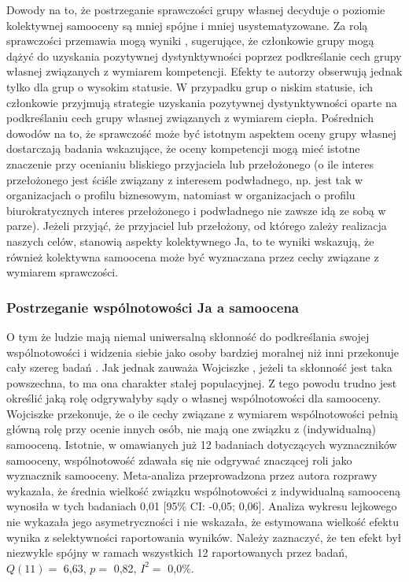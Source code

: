 \documentclass[man]{apa6}
\begin{document}
Dowody na to, że postrzeganie sprawczości grupy własnej decyduje o poziomie kolektywnej samooceny są mniej spójne i mniej usystematyzowane. Za rolą sprawczości przemawia mogą wyniki \textcite{oldmeadow2010social}, sugerujące, że członkowie grupy mogą dążyć do uzyskania pozytywnej dystynktywności poprzez podkreślanie cech grupy własnej związanych z wymiarem kompetencji. Efekty te autorzy obserwują jednak tylko dla grup o wysokim statusie. W przypadku grup o niskim statusie, ich członkowie przyjmują strategie uzyskania pozytywnej dystynktywności oparte na podkreślaniu cech grupy własnej związanych z wymiarem ciepła. Pośrednich dowodów na to, że sprawczość może być istotnym aspektem oceny grupy własnej dostarczają badania \textcite{wojciszke2008primacy} wskazujące, że oceny kompetencji mogą mieć istotne znaczenie przy ocenianiu bliskiego przyjaciela lub przełożonego (o ile interes przełożonego jest ściśle związany z interesem podwładnego, np. jest tak w organizacjach o profilu biznesowym, natomiast w organizacjach o profilu biurokratycznych interes przełożonego i podwładnego nie zawsze idą ze sobą w parze). Jeżeli przyjąć, że przyjaciel lub przełożony, od którego zależy realizacja naszych celów, stanowią aspekty kolektywnego Ja, to te wyniki wskazują, że również kolektywna samoocena może być wyznaczana przez cechy związane z wymiarem sprawczości.

\subsubsection{Postrzeganie wspólnotowości Ja a samoocena}

O tym że ludzie mają niemal uniwersalną skłonność do podkreślania swojej wspólnotowości i widzenia siebie jako osoby bardziej moralnej niż inni przekonuje cały szereg badań \parencite[np.,][]{allison1989being, van1998being, epley2000feeling, balcetis2008collectivists, paulhus1998egoistic}. Jak jednak zauważa Wojciszke \parencite[np.,]{wojciszke2010sprawczosc}, jeżeli ta skłonność jest taka powszechna, to ma ona charakter stałej populacyjnej. Z tego powodu trudno jest określić jaką rolę odgrywałyby sądy o własnej wspólnotowości dla samooceny.\\

Wojciszke \parencite[np.,][]{wojciszke2006perspektywa} przekonuje, że o ile cechy związane z wymiarem wspólnotowości pełnią główną rolę przy ocenie innych osób, nie mają one związku z (indywidualną) samooceną. Istotnie, w omawianych już 12 badaniach dotyczących wyznaczników samooceny, wspólnotowość zdawała się nie odgrywać znaczącej roli jako wyznacznik samooceny. Meta-analiza przeprowadzona przez autora rozprawy wykazała, że średnia wielkość związku wspólnotowości z indywidualną samooceną wynosiła w tych badaniach 0,01 [95\% CI: -0,05; 0,06]. Analiza wykresu lejkowego nie wykazała jego asymetryczności i nie wskazała, że estymowana wielkość efektu wynika z selektywności raportowania wyników. Należy zaznaczyć, że ten efekt był niezwykle spójny w ramach wszystkich 12 raportowanych przez \textcite{wojciszke2010sprawczosc} badań, $Q(11) = $ 6,63, $p = $ 0,82, $I^2 = $ 0,0\%. \\
\end{document}
